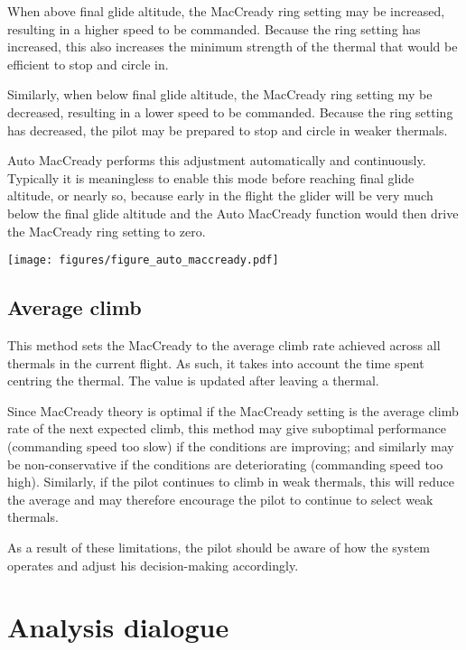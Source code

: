 When above final glide altitude, the MacCready ring setting may be
increased, resulting in a higher speed to be commanded.  Because the
ring setting has increased, this also increases the minimum strength
of the thermal that would be efficient to stop and circle in.

Similarly, when below final glide altitude, the MacCready ring setting
my be decreased, resulting in a lower speed to be commanded.  Because
the ring setting has decreased, the pilot may be prepared to stop and
circle in weaker thermals.

Auto MacCready performs this adjustment automatically and
continuously.  Typically it is meaningless to enable this mode before
reaching final glide altitude, or nearly so, because early in the
flight the glider will be very much below the final glide altitude and
the Auto MacCready function would then drive the MacCready ring
setting to zero.

\begin{maxipage}
\begin{center}
\texttt{[image: figures/figure\_auto\_maccready.pdf]}
\end{center}
\end{maxipage}


\subsection*{Average climb}

This method sets the MacCready to the average climb rate achieved
across all thermals in the current flight.  As such, it takes into
account the time spent centring the thermal.  The value is updated
after leaving a thermal.

Since MacCready theory is optimal if the MacCready setting is the
average climb rate of the next expected climb, this method may give
suboptimal performance (commanding speed too slow) if the conditions
are improving; and similarly may be non-conservative if the conditions
are deteriorating (commanding speed too high).  Similarly, if the pilot
continues to climb in weak thermals, this will reduce the average
and may therefore encourage the pilot to continue to select weak thermals.

As a result of these limitations, the pilot should be aware of how the
system operates and adjust his decision-making accordingly.


\section{Analysis dialogue}

